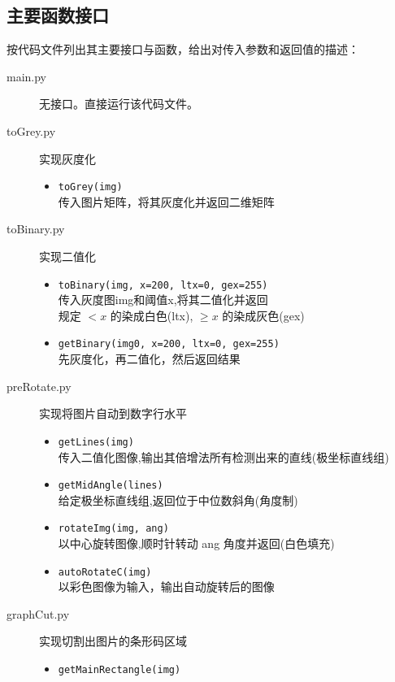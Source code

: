 \documentclass{ctexart}
\begin{document}
\subsection{主要函数接口}
按代码文件列出其主要接口与函数，给出对传入参数和返回值的描述：
\begin{description}
    \item[main.py] 无接口。直接运行该代码文件。
    \item[toGrey.py] 实现灰度化
    \begin{itemize}
        \item \verb|toGrey(img)| \\
        传入图片矩阵，将其灰度化并返回二维矩阵
    \end{itemize}
    \item[toBinary.py] 实现二值化
    \begin{itemize}
        \item \verb|toBinary(img, x=200, ltx=0, gex=255)| \\
        传入灰度图img和阈值x,将其二值化并返回\\
        规定 $< x$ 的染成白色(ltx), $\ge x$ 的染成灰色(gex)
        \item \verb|getBinary(img0, x=200, ltx=0, gex=255)| \\
        先灰度化，再二值化，然后返回结果
    \end{itemize}
    \item[preRotate.py] 实现将图片自动到数字行水平
    \begin{itemize}
        \item \verb|getLines(img)| \\
        传入二值化图像,输出其倍增法所有检测出来的直线(极坐标直线组)
        \item \verb|getMidAngle(lines)| \\
        给定极坐标直线组,返回位于中位数斜角(角度制)
        \item \verb|rotateImg(img, ang)| \\
        以中心旋转图像,顺时针转动 ang 角度并返回(白色填充)
        \item \verb|autoRotateC(img)| \\
        以彩色图像为输入，输出自动旋转后的图像
    \end{itemize}
    \item[graphCut.py] 实现切割出图片的条形码区域
    \begin{itemize}
        \item \verb|getMainRectangle(img)| \\

\end{itemize}
\end{description}
\end{document}
